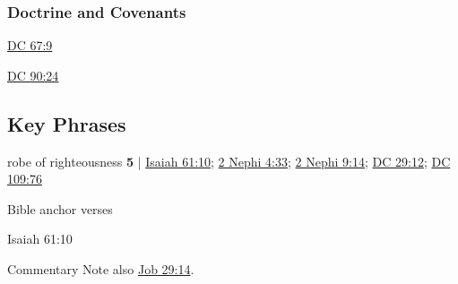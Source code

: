 	\subsubsection{Doctrine and Covenants} %
		\label{RIGHTEOUSNESS-DC}
	
		
		\begin{compactdesc}
			\item[{\hyperref[DC67-9]{DC 67:9}}]
			\item[{\hyperref[DC90-24]{DC 90:24}}]
		\end{compactdesc}
		
	
		
		
\subsection{Key Phrases} %
	\label{RIGHTEOUSNESS-PHRASES}

	\begin{compactdesc}
	
		\item[robe of righteousness] \textbf{5} | \hyperref[ISAIAH-61-10]{Isaiah 61:10}; \hyperref[2NEPHI-4-33]{2 Nephi 4:33}; \hyperref[2NEPHI-9-14]{2 Nephi 9:14}; \hyperref[DC29-12]{DC 29:12}; \hyperref[DC109-76]{DC 109:76}
			\begin{compactdesc}
				\item[Bible anchor verses] \phantom{.}
					\begin{compactdesc}
						\item[Isaiah 61:10] 
					\end{compactdesc}
				\item[Commentary] Note also \hyperref[JOB-29-14]{Job 29:14}.
			\end{compactdesc}
			
	\end{compactdesc}
	
